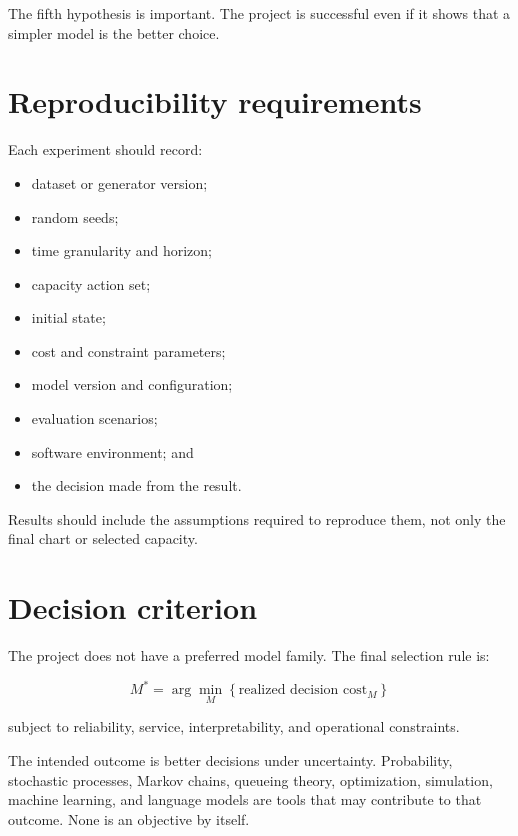 \documentclass[11pt,a4paper]{article}
\newcommand{\equationnote}[1]{\begin{center}\colorbox{boxblue}{\parbox{0.92\linewidth}{\begin{equation*}#1\end{equation*}}}\end{center}}
\begin{document}
The fifth hypothesis is important. The project is successful even if it shows that a simpler model is the better choice.

\section{Reproducibility requirements}

Each experiment should record:
\begin{itemize}
  \item dataset or generator version;
  \item random seeds;
  \item time granularity and horizon;
  \item capacity action set;
  \item initial state;
  \item cost and constraint parameters;
  \item model version and configuration;
  \item evaluation scenarios;
  \item software environment; and
  \item the decision made from the result.
\end{itemize}

Results should include the assumptions required to reproduce them, not only the final chart or selected capacity.

\section{Decision criterion}

The project does not have a preferred model family. The final selection rule is:

\equationnote{M^* = \arg\min_M \left\{\text{realized decision cost}_M\right\}}

subject to reliability, service, interpretability, and operational constraints.

The intended outcome is better decisions under uncertainty. Probability, stochastic processes, Markov chains, queueing theory, optimization, simulation, machine learning, and language models are tools that may contribute to that outcome. None is an objective by itself.
\end{document}
